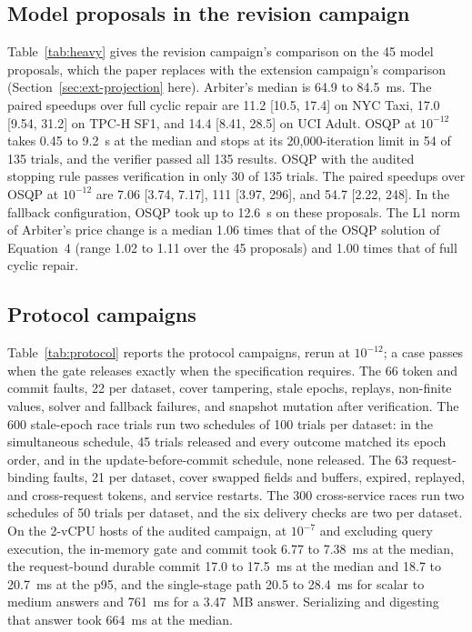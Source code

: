 \documentclass[10pt]{article}
\begin{document}
\subsection{Model proposals in the revision campaign}
Table~\ref{tab:heavy} gives the revision campaign's comparison on the 45 model proposals, which the paper replaces with the extension campaign's comparison (Section~\ref{sec:ext-projection} here). Arbiter's median is 64.9 to 84.5~ms. The paired speedups over full cyclic repair are 11.2 [10.5, 17.4] on NYC Taxi, 17.0 [9.54, 31.2] on TPC-H SF1, and 14.4 [8.41, 28.5] on UCI Adult. OSQP at $10^{-12}$ takes 0.45 to 9.2~s at the median and stops at its 20{,}000-iteration limit in 54 of 135 trials, and the verifier passed all 135 results. OSQP with the audited stopping rule passes verification in only 30 of 135 trials. The paired speedups over OSQP at $10^{-12}$ are 7.06 [3.74, 7.17], 111 [3.97, 296], and 54.7 [2.22, 248]. In the fallback configuration, OSQP took up to 12.6~s on these proposals. The L1 norm of Arbiter's price change is a median 1.06 times that of the OSQP solution of Equation~4 (range 1.02 to 1.11 over the 45 proposals) and 1.00 times that of full cyclic repair.



\subsection{Protocol campaigns}
Table~\ref{tab:protocol} reports the protocol campaigns, rerun at $10^{-12}$; a case passes when the gate releases exactly when the specification requires. The 66 token and commit faults, 22 per dataset, cover tampering, stale epochs, replays, non-finite values, solver and fallback failures, and snapshot mutation after verification. The 600 stale-epoch race trials run two schedules of 100 trials per dataset: in the simultaneous schedule, 45 trials released and every outcome matched its epoch order, and in the update-before-commit schedule, none released. The 63 request-binding faults, 21 per dataset, cover swapped fields and buffers, expired, replayed, and cross-request tokens, and service restarts. The 300 cross-service races run two schedules of 50 trials per dataset, and the six delivery checks are two per dataset. On the 2-vCPU hosts of the audited campaign, at $10^{-7}$ and excluding query execution, the in-memory gate and commit took 6.77 to 7.38~ms at the median, the request-bound durable commit 17.0 to 17.5~ms at the median and 18.7 to 20.7~ms at the p95, and the single-stage path 20.5 to 28.4~ms for scalar to medium answers and 761~ms for a 3.47~MB answer. Serializing and digesting that answer took 664~ms at the median.
\end{document}
